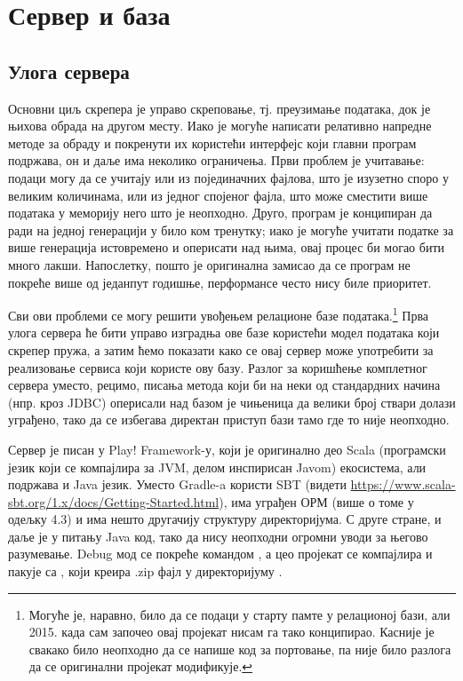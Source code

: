 \chapter{Сервер и база}\label{ch:\thechapter}

\section{Улога сервера}

Основни циљ скрепера је управо скреповање, тј. преузимање података, док је њихова обрада на другом месту. Иако је могуће написати релативно напредне методе за обраду и покренути их користећи интерфејс који главни програм подржава, он и даље има неколико ограничења. Први проблем је учитавање: подаци могу да се учитају или из појединачних фајлова, што је изузетно споро у великим количинама, или из једног спојеног фајла, што може сместити више података у меморију него што је неопходно. Друго, програм је конципиран да ради на једној генерацији у било ком тренутку; иако је могуће учитати податке за више генерација истовремено и оперисати над њима, овај процес би могао бити много лакши. Напослетку, пошто је оригинална замисао да се програм не покреће више од једанпут годишње, перформансе често нису биле приоритет.

Сви ови проблеми се могу решити увођењем релационе базе података.\footnote{Могуће је, наравно, било да се подаци у старту памте у релационој бази, али 2015. када сам започео овај пројекат нисам га тако конципирао. Касније је свакако било неопходно да се напише код за портовање, па није било разлога да се оригинални пројекат модификује.} Прва улога сервера ће бити управо изградња ове базе користећи модел података који скрепер пружа, а затим ћемо показати како се овај сервер може употребити за реализовање сервиса који користе ову базу. Разлог за коришћење комплетног сервера уместо, рецимо, писања метода који би на неки од стандардних начина (нпр. кроз JDBC) оперисали над базом је чињеница да велики број ствари долази уграђено, тако да се избегава директан приступ бази тамо где то није неопходно.

Сервер је писан у Play! Framework-у, који је оригинално део Scala (програмски језик који се компајлира за JVM, делом инспирисан Javom) екосистема, али подржава и Java језик. Уместо Gradle-a користи SBT (видети \url{https://www.scala-sbt.org/1.x/docs/Getting-Started.html}), има уграђен ОРМ (више о томе у одељку 4.3) и има нешто другачију структуру директоријума. С друге стране, и даље је у питању Java код, тако да нису неопходни огромни уводи за његово разумевање. Debug мод се покреће командом , а цео пројекат се компајлира и пакује са , који креира .zip фајл у директоријуму .



